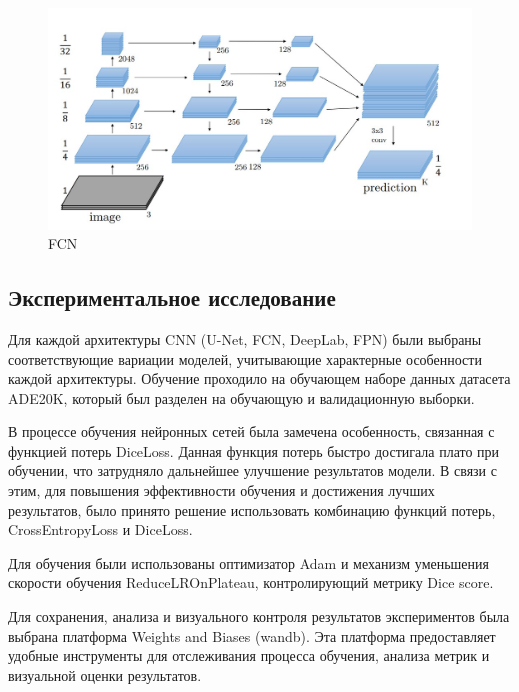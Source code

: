\documentclass[11pt]{article}
\begin{document}
\begin{figure}
\centering
\includegraphics{../resources/fpn-architecture.jpg}
\caption{FCN}
\end{figure}

    \hypertarget{ux44dux43aux441ux43fux435ux440ux438ux43cux435ux43dux442ux430ux43bux44cux43dux43eux435-ux438ux441ux441ux43bux435ux434ux43eux432ux430ux43dux438ux435}{%
\subsection{Экспериментальное
исследование}\label{ux44dux43aux441ux43fux435ux440ux438ux43cux435ux43dux442ux430ux43bux44cux43dux43eux435-ux438ux441ux441ux43bux435ux434ux43eux432ux430ux43dux438ux435}}

    Для каждой архитектуры CNN (U-Net, FCN, DeepLab, FPN) были выбраны
соответствующие вариации моделей, учитывающие характерные особенности
каждой архитектуры. Обучение проходило на обучающем наборе данных
датасета ADE20K, который был разделен на обучающую и валидационную
выборки.

В процессе обучения нейронных сетей была замечена особенность, связанная
с функцией потерь DiceLoss. Данная функция потерь быстро достигала плато
при обучении, что затрудняло дальнейшее улучшение результатов модели. В
связи с этим, для повышения эффективности обучения и достижения лучших
результатов, было принято решение использовать комбинацию функций
потерь, CrossEntropyLoss и DiceLoss.

Для обучения были использованы оптимизатор Adam и механизм уменьшения
скорости обучения ReduceLROnPlateau, контролирующий метрику Dice score.

Для сохранения, анализа и визуального контроля результатов экспериментов
была выбрана платформа Weights and Biases (wandb). Эта платформа
предоставляет удобные инструменты для отслеживания процесса обучения,
анализа метрик и визуальной оценки результатов.
\end{document}
